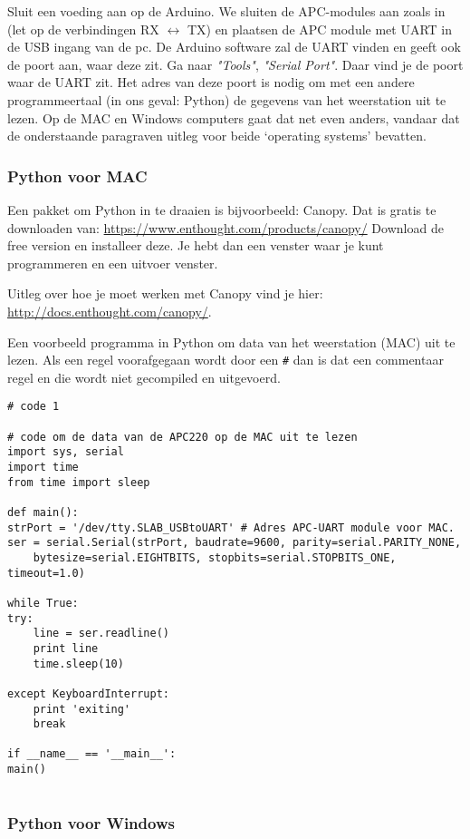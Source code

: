 Sluit een voeding aan op de Arduino.
We sluiten de APC-modules aan zoals in  (let op de
verbindingen RX $\longleftrightarrow$ TX) en plaatsen de APC module met UART
in de USB ingang van de pc. De Arduino software zal de UART vinden en
geeft ook de poort aan, waar deze zit. Ga naar \emph {"Tools"},
\emph{"Serial Port"}. Daar vind je de poort waar de UART  zit. Het adres
van deze poort is nodig om met een andere programmeertaal (in ons
geval: Python) de gegevens van het weerstation uit te lezen. 
Op de MAC en Windows computers gaat dat net even anders, vandaar dat de onderstaande
paragraven uitleg voor beide `operating systems' bevatten.

\subsubsection{Python voor MAC}
Een pakket om Python in te draaien is bijvoorbeeld: Canopy.
Dat is gratis te downloaden van: \url{https://www.enthought.com/products/canopy/}
Download de free version en installeer deze. Je hebt dan een venster waar je kunt
programmeren en een uitvoer venster.

Uitleg over hoe je moet werken met Canopy vind je hier:
\url{http://docs.enthought.com/canopy/}.

Een voorbeeld programma in Python om data van het weerstation (MAC) uit te lezen.
Als een regel voorafgegaan wordt door een \verb|#| dan is dat een commentaar 
regel en die wordt niet gecompiled en uitgevoerd.

\begin{verbatim}
# code 1

# code om de data van de APC220 op de MAC uit te lezen
import sys, serial
import time
from time import sleep
      
def main():
strPort = '/dev/tty.SLAB_USBtoUART' # Adres APC-UART module voor MAC.
ser = serial.Serial(strPort, baudrate=9600, parity=serial.PARITY_NONE, 
    bytesize=serial.EIGHTBITS, stopbits=serial.STOPBITS_ONE, timeout=1.0)
    
while True:
try:
    line = ser.readline()
    print line
    time.sleep(10)
 
except KeyboardInterrupt:
    print 'exiting'
    break
    
if __name__ == '__main__':
main()
    
\end{verbatim}

\subsubsection{Python voor Windows}

